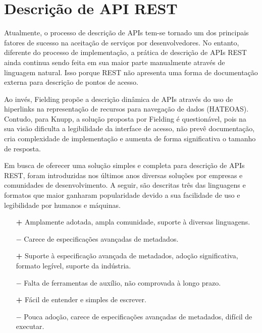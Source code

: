 \section[Descrição de API REST]{Descrição de API REST}

Atualmente, o processo de descrição de APIs tem-se tornado um dos principais fatores de sucesso na aceitação de serviços por desenvolvedores. No entanto, diferente do processo de implementação, a prática de descrição de APIs REST ainda continua sendo feita em sua maior parte manualmente através de linguagem natural. Isso porque REST não apresenta uma forma de documentação externa para descrição de pontos de acesso. \cite{LuckyEtAl2016}

Ao invés, Fielding propõe a descrição dinâmica de APIs através do uso de hiperlinks na representação de recursos para navegação de dados (HATEOAS). Contudo, para Knupp, a solução proposta por Fielding é questionável, pois na sua visão dificulta a legibilidade da interface de acesso, não prevê documentação, cria complexidade de implementação e aumenta de forma significativa o tamanho de resposta. \cite{Knupp2016}

Em busca de oferecer uma solução simples e completa para descrição de APIs REST, foram introduzidas nos últimos anos diversas soluções por empresas e comunidades de desenvolvimento. A seguir, são descritas três das linguagens e formatos que maior ganharam popularidade devido a sua facilidade de uso e legibilidade por humanos e máquinas. \cite{Sandoval2015}

\begin{description}[leftmargin=8em,style=nextline]
  \item[\textbf{OpenAPI}] 
    \begin{enumerate}
        \item[\textbf{+}] Amplamente adotada, ampla comunidade, suporte à diversas linguagens.
        \item[\textbf{$-$}] Carece de especificações avançadas de metadados.
    \end{enumerate}
  \item[\textbf{RAML}] 
    \begin{enumerate}
      \item[\textbf{+}] Suporte à especificação avançada de metadados, adoção significativa, formato legível, suporte da indústria.
       \item[\textbf{$-$}] Falta de ferramentas de auxílio, não comprovada à longo prazo.
    \end{enumerate}
  \item[\textbf{API Blueprint}] 
    \begin{enumerate}
      \item[\textbf{+}] Fácil de entender e simples de escrever.
       \item[\textbf{$-$}] Pouca adoção, carece de especificações avançadas de metadados, difícil de executar.
    \end{enumerate}
\end{description}

